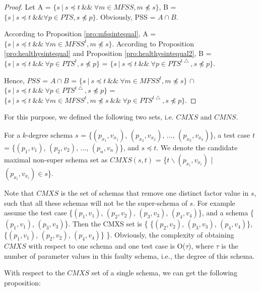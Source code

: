 \begin{proof}

Let A = $\{ s\ |\  s \preceq t\ \&\&\ \forall m \in MFSS,  m \npreceq s \}$, B = $ \{ s\ |\ s \preceq t\ \&\&  \forall p \in PTS, s \npreceq p \} $. Obviously, PSS = $A \cap B$.

According to Proposition \ref{pro:mfssintequal}, A = $\{ s\ |\  s \preceq t\ \&\&\ \forall m \in MFSS^{t},  m \npreceq s \}$.
According to Proposition \ref{pro:healthysintequal} and Proposition \ref{pro:healthysintequal2}, B = $\{ s\ |\  s \preceq t\ \&\&\ \forall p \in PTS^{t},  s \npreceq p \}$ = $\{ s\ |\  s \preceq t\ \&\&\ \forall p \in PTS^{t\bigtriangleup},  s \npreceq p \}$.

Hence, $PSS$ = $A \cap B$ = $\{ s\ |\  s \preceq t\ \&\&\ \forall m \in MFSS^{t},  m \npreceq s \}$ $\cap$ $\{ s\ |\  s \preceq t\ \&\&\ \forall p \in PTS^{t\bigtriangleup},  s \npreceq p \}$ = $\{ s\ |\ s \preceq t\ \&\&\ \forall m \in MFSS^{t},  m \npreceq s  \ \&\&\  \forall p \in PTS^{t\bigtriangleup}, s \npreceq p \}$.
\end{proof}



For this purpose, we defined the following two sets, i.e. $CMXS$ and $CMNS$.

\begin{definition}
For a $k$-degree schema $s$ = \{$(p_{x_{1}}, v_{x_{1}})$, $(p_{x_{2}}, v_{x_{2}})$, ..., $(p_{x_{k}}, v_{x_{k}})$\}, a test case $t$ = \{$(p_{1}, v_{1})$, $(p_{2}, v_{2})$, ..., $(p_{n}, v_{n})$\}, and $s \preceq t$. We denote the candidate maximal non-super schema set as $CMXS(s,t)$ = \{$t \backslash (p_{x_{i}}, v_{x_{i}})$ | $(p_{x_{i}}, v_{x_{i}}) \in s $\}.
\end{definition}

Note that $CMXS$ is the set of schemas that remove one distinct factor value in $s$, such that all these schemas will not be the super-schema of $s$. For example assume the test case \{$(p_{1}, v_{1})$, $(p_{2}, v_{2})$, $(p_{3}, v_{3})$, $(p_{4}, v_{4})$\}, and a schema \{$(p_{1}, v_{1})$, $(p_{3}, v_{3})$\}. Then the CMXS set is \{ \{$(p_{2}, v_{2})$,  $(p_{3}, v_{3})$, $(p_{4}, v_{4})$\}, \{$(p_{1}, v_{1})$,  $(p_{2}, v_{2})$, $(p_{4}, v_{4})$\} \}. Obviously, the complexity of obtaining $CMXS$ with respect to one schema and one test case is O($\tau$), where $\tau$ is the number of parameter values in this faulty schema, i.e., the degree of this schema.

With respect to the $CMXS$ set of a single schema, we can get the following proposition:


